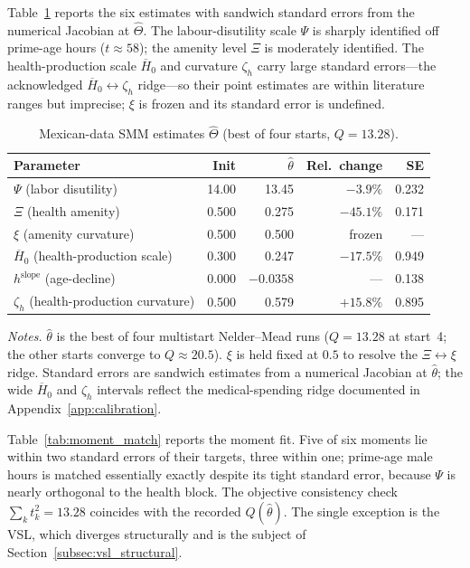 \documentclass[12pt,a4paper]{article}
\begin{document}
Table~\ref{tab:theta_hat} reports the six estimates with sandwich standard errors from the numerical Jacobian at $\widehat\Theta$. The labour-disutility scale $\Psi$ is sharply identified off prime-age hours ($t\approx 58$); the amenity level $\Xi$ is moderately identified. The health-production scale $\overline{H}_0$ and curvature $\zeta_h$ carry large standard errors---the acknowledged $\overline{H}_0\leftrightarrow\zeta_h$ ridge---so their point estimates are within literature ranges but imprecise; $\xi$ is frozen and its standard error is undefined.

\begin{table}[H]
\centering
\caption{Mexican-data SMM estimates $\widehat\Theta$ (best of four starts, $Q=13.28$).}
\label{tab:theta_hat}
\begin{tabular}{lrrrr}
\toprule
Parameter & Init & $\widehat\theta$ & Rel.\ change & SE \\
\midrule
$\Psi$ (labor disutility)                  & 14.00  & 13.45    & $-3.9\%$  & 0.232 \\
$\Xi$ (health amenity)                     & 0.500  & 0.275    & $-45.1\%$ & 0.171 \\
$\xi$ (amenity curvature)                  & 0.500  & 0.500    & frozen    & ---   \\
$\overline{H}_0$ (health-production scale) & 0.300  & 0.247    & $-17.5\%$ & 0.949 \\
$h^{\mathrm{slope}}$ (age-decline)         & 0.000  & $-0.0358$ & ---      & 0.138 \\
$\zeta_h$ (health-production curvature)    & 0.500  & 0.579    & $+15.8\%$ & 0.895 \\
\bottomrule
\end{tabular}

\vspace{0.5em}
\begin{minipage}{0.92\textwidth}
\footnotesize \textit{Notes.} $\widehat\theta$ is the best of four multistart Nelder--Mead runs ($Q=13.28$ at start~4; the other starts converge to $Q\approx 20.5$). $\xi$ is held fixed at $0.5$ to resolve the $\Xi\leftrightarrow\xi$ ridge. Standard errors are sandwich estimates from a numerical Jacobian at $\widehat\theta$; the wide $\overline{H}_0$ and $\zeta_h$ intervals reflect the medical-spending ridge documented in Appendix~\ref{app:calibration}.
\end{minipage}
\end{table}

Table~\ref{tab:moment_match} reports the moment fit. Five of six moments lie within two standard errors of their targets, three within one; prime-age male hours is matched essentially exactly despite its tight standard error, because $\Psi$ is nearly orthogonal to the health block. The objective consistency check $\sum_k t_k^2 = 13.28$ coincides with the recorded $Q(\widehat\theta)$. The single exception is the VSL, which diverges structurally and is the subject of Section~\ref{subsec:vsl_structural}.
\end{document}
